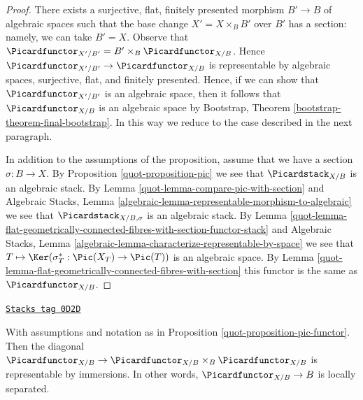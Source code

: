 \begin{proof}

There exists a surjective, flat, finitely presented morphism
$B' \to B$ of algebraic spaces such that the base change $X' = X \times_B B'$
over $B'$ has a section: namely, we can take $B' = X$.
Observe that $\Picardfunctor_{X'/B'} = B' \times_B \Picardfunctor_{X/B}$.
Hence $\Picardfunctor_{X'/B'} \to \Picardfunctor_{X/B}$ is representable
by algebraic spaces, surjective, flat, and finitely presented.
Hence, if we can show that $\Picardfunctor_{X'/B'}$ is an algebraic space,
then it follows that $\Picardfunctor_{X/B}$
is an algebraic space by Bootstrap, Theorem
\ref{bootstrap-theorem-final-bootstrap}.
In this way we reduce to the case described in the next paragraph.

\medskip\noindent
In addition to the assumptions of the proposition, assume that
we have a section $\sigma : B \to X$. By
Proposition \ref{quot-proposition-pic} we see that
$\Picardstack_{X/B}$ is an algebraic stack.
By Lemma \ref{quot-lemma-compare-pic-with-section} and
Algebraic Stacks, Lemma
\ref{algebraic-lemma-representable-morphism-to-algebraic}
we see that $\Picardstack_{X/B, \sigma}$ is an algebraic stack.
By Lemma
\ref{quot-lemma-flat-geometrically-connected-fibres-with-section-functor-stack}
and Algebraic Stacks, Lemma
\ref{algebraic-lemma-characterize-representable-by-space}
we see that $T \mapsto \Ker(\sigma_T^* : \Pic(X_T) \to \Pic(T))$
is an algebraic space.
By Lemma \ref{quot-lemma-flat-geometrically-connected-fibres-with-section}
this functor is the same as $\Picardfunctor_{X/B}$.
\end{proof}

\begin{lemma}
\label{quot-lemma-diagonal-pic}
\href{https://stacks.math.columbia.edu/tag/0D2D}{\texttt{Stacks tag 0D2D}}

With assumptions and notation as in Proposition \ref{quot-proposition-pic-functor}.
Then the diagonal
$\Picardfunctor_{X/B} \to \Picardfunctor_{X/B} \times_B \Picardfunctor_{X/B}$
is representable by immersions. In other words, $\Picardfunctor_{X/B} \to B$
is locally separated.
\end{lemma}

